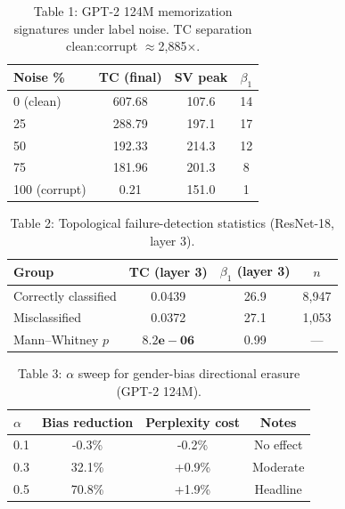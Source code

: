 
\begin{table}[t]
\centering
\begin{tabular}{lccc}
\toprule
Noise \% & TC (final) & SV peak & $\beta_1$ \\
\midrule
0 (clean) & 607.68 & 107.6 & 14 \\
25 & 288.79 & 197.1 & 17 \\
50 & 192.33 & 214.3 & 12 \\
75 & 181.96 & 201.3 & 8 \\
100 (corrupt) & 0.21 & 151.0 & 1 \\
\bottomrule
\end{tabular}
\caption{Table 1: GPT-2 124M memorization signatures under label noise. TC separation clean:corrupt $\approx$2,885$\times$.}
\end{table}

\begin{table}[t]
\centering
\begin{tabular}{lccc}
\toprule
Group & TC (layer 3) & $\beta_1$ (layer 3) & $n$ \\
\midrule
Correctly classified & 0.0439 & 26.9 & 8,947 \\
Misclassified & 0.0372 & 27.1 & 1,053 \\
Mann--Whitney $p$ & $\mathbf{8.2e-06}$ & 0.99 & --- \\
\bottomrule
\end{tabular}
\caption{Table 2: Topological failure-detection statistics (ResNet-18, layer 3).}
\end{table}

\begin{table}[t]
\centering
\begin{tabular}{lccc}
\toprule
$\alpha$ & Bias reduction & Perplexity cost & Notes \\
\midrule
0.1 & -0.3\% & -0.2\% & No effect \\
0.3 & 32.1\% & +0.9\% & Moderate \\
0.5 & 70.8\% & +1.9\% & Headline \\
\bottomrule
\end{tabular}
\caption{Table 3: $\alpha$ sweep for gender-bias directional erasure (GPT-2 124M).}
\end{table}

